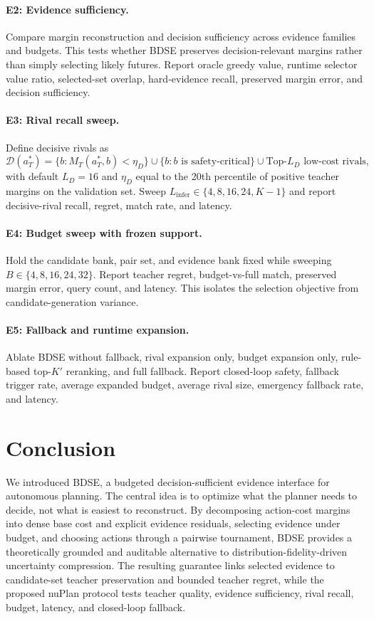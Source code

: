 \documentclass{article}
\begin{document}
\paragraph{E2: Evidence sufficiency.}
Compare margin reconstruction and decision sufficiency across evidence families and budgets. This tests whether BDSE preserves decision-relevant margins rather than simply selecting likely futures. Report oracle greedy value, runtime selector value ratio, selected-set overlap, hard-evidence recall, preserved margin error, and decision sufficiency.

\paragraph{E3: Rival recall sweep.}
Define decisive rivals as
\begin{equation}
\mathcal D(a_T^*)=\{b:M_T(a_T^*,b)<\eta_D\}\cup
\{b:b\text{ is safety-critical}\}\cup
\text{Top-}L_D\text{ low-cost rivals},
\end{equation}
with default $L_D=16$ and $\eta_D$ equal to the 20th percentile of positive teacher margins on the validation set. Sweep $L_{\mathrm{infer}}\in\{4,8,16,24,K-1\}$ and report decisive-rival recall, regret, match rate, and latency.

\paragraph{E4: Budget sweep with frozen support.}
Hold the candidate bank, pair set, and evidence bank fixed while sweeping $B\in\{4,8,16,24,32\}$. Report teacher regret, budget-vs-full match, preserved margin error, query count, and latency. This isolates the selection objective from candidate-generation variance.

\paragraph{E5: Fallback and runtime expansion.}
Ablate BDSE without fallback, rival expansion only, budget expansion only, rule-based top-$K'$ reranking, and full fallback. Report closed-loop safety, fallback trigger rate, average expanded budget, average rival size, emergency fallback rate, and latency.


\section{Conclusion}

We introduced BDSE, a budgeted decision-sufficient evidence interface for autonomous planning. The central idea is to optimize what the planner needs to decide, not what is easiest to reconstruct. By decomposing action-cost margins into dense base cost and explicit evidence residuals, selecting evidence under budget, and choosing actions through a pairwise tournament, BDSE provides a theoretically grounded and auditable alternative to distribution-fidelity-driven uncertainty compression. The resulting guarantee links selected evidence to candidate-set teacher preservation and bounded teacher regret, while the proposed nuPlan protocol tests teacher quality, evidence sufficiency, rival recall, budget, latency, and closed-loop fallback.
\end{document}
